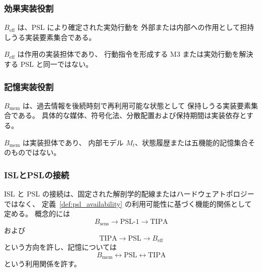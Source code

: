 \subsubsection{効果実装役割}
\label{subsubsec:effector}

\begin{definition}
\label{def:effector}
$B_{\mathrm{eff}}$ は、PSL により確定された実効行動を
外部または内部への作用として担持しうる実装要素集合である。
\end{definition}

\begin{remark}
\label{rem:effector_distinction}
$B_{\mathrm{eff}}$ は作用の実装担体であり、
行動指令を形成する M3 または実効行動を解決する PSL と同一ではない。
\end{remark}

\subsubsection{記憶実装役割}
\label{subsubsec:mem_substrate}

\begin{definition}
\label{def:mem_substrate}
$B_{\mathrm{mem}}$ は、過去情報を後続時刻で再利用可能な状態として
保持しうる実装要素集合である。
具体的な媒体、符号化法、分散配置および保持期間は実装依存とする。
\end{definition}

\begin{remark}[記憶実装役割と内部モデルの区別]
\label{rem:mem_model_distinction}
$B_{\mathrm{mem}}$ は実装担体であり、
内部モデル $M_t$、状態履歴または五機能的記憶集合そのものではない。
\end{remark}

\subsubsection{ISLとPSLの接続}
\label{subsubsec:impl_connection}

\begin{definition}
\label{def:impl_psl_connection}
ISL と PSL の接続は、固定された解剖学的配線またはハードウェアトポロジーではなく、
定義~\ref{def:psl_availability} の利用可能性に基づく機能的関係として定める。
概念的には
\[
  B_{\mathrm{sens}}
  \longrightarrow
  \mathrm{PSL\mbox{-}1}
  \longrightarrow
  \mathrm{TIPA}
\]
および
\[
  \mathrm{TIPA}
  \longrightarrow
  \mathrm{PSL}
  \longrightarrow
  B_{\mathrm{eff}}
\]
という方向を許し、記憶については
\[
  B_{\mathrm{mem}}
  \longleftrightarrow
  \mathrm{PSL}
  \longleftrightarrow
  \mathrm{TIPA}
\]
という利用関係を許す。
\end{definition}

